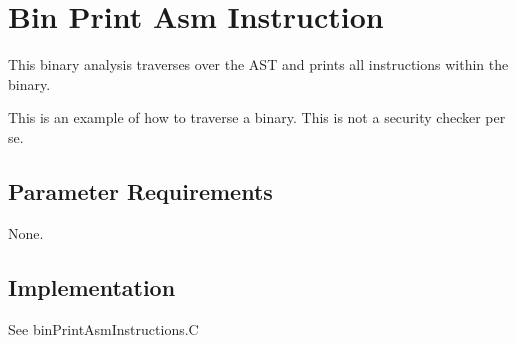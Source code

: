 %
%

\section{Bin Print Asm Instruction}
\label{BinPrintAsmInstruction::overview}

This binary analysis traverses over the AST and prints all instructions within the binary.

This is an example of how to traverse a binary. This is not a security checker per se.


\subsection{Parameter Requirements}

None.

\subsection{Implementation}

See binPrintAsmInstructions.C


